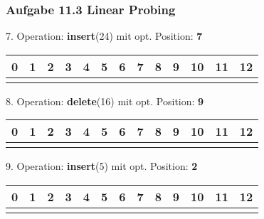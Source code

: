 \documentclass{beamer}
\begin{document}
\begin{frame}
	\frametitle{Aufgabe 11.3 Linear Probing}
	7. Operation: \textbf{insert}(24) mit opt. Position: \textbf{7}
	\begin{table}
		\centering
		\begin{tabular}{c|c|c|c|c|c|c|c|c|c|c|c|c}
			0 & 1 & 2 & 3 & 4 & 5 & 6 & 7 & 8 & 9 & 10 & 11 & 12 \\
			\hline
			  &   &   &   &   &   &   &   &   &   &    &    &    \\
		\end{tabular}
	\end{table}

	8. Operation: \textbf{delete}(16) mit opt. Position: \textbf{9}
	\begin{table}
		\centering
		\begin{tabular}{c|c|c|c|c|c|c|c|c|c|c|c|c}
			0 & 1 & 2 & 3 & 4 & 5 & 6 & 7 & 8 & 9 & 10 & 11 & 12 \\
			\hline
			  &   &   &   &   &   &   &   &   &   &    &    &    \\
		\end{tabular}
	\end{table}

	9. Operation: \textbf{insert}(5) mit opt. Position: \textbf{2}
	\begin{table}
		\centering
		\begin{tabular}{c|c|c|c|c|c|c|c|c|c|c|c|c}
			0 & 1 & 2 & 3 & 4 & 5 & 6 & 7 & 8 & 9 & 10 & 11 & 12 \\
			\hline
			  &   &   &   &   &   &   &   &   &   &    &    &    \\
		\end{tabular}
	\end{table}
\end{frame}
\end{document}

